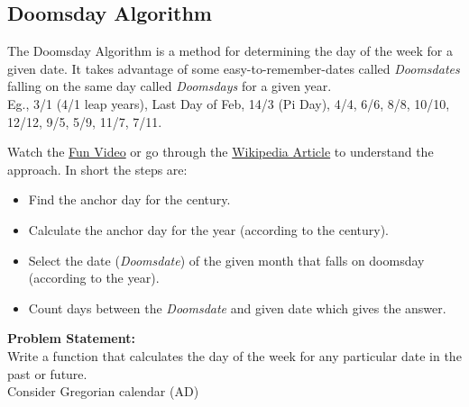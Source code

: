 \documentclass[../../Problems]{subfiles}
\begin{document}
\subsection{Doomsday Algorithm}
The Doomsday Algorithm is a method for determining the day of the week for a given date. It  takes advantage of some easy-to-remember-dates called \emph{Doomsdates} falling on the same day called \emph{Doomsdays} for a given year.\\
Eg., 3/1 (4/1 leap years), Last Day of Feb, 14/3 (Pi Day), 4/4, 6/6, 8/8, 10/10, 12/12, 9/5, 5/9, 11/7, 7/11.

Watch the \href{https://youtu.be/z2x3SSBVGJU}{Fun Video} or go through the \href{https://en.wikipedia.org/wiki/Doomsday_rule}{Wikipedia Article} to understand the approach. In short the steps are:
\begin{itemize}
\item Find the anchor day for the century.
\item Calculate the anchor day for the year (according to the century).
\item Select the date (\emph{Doomsdate}) of the given month that falls on doomsday (according to the year).
\item Count days between the \emph{Doomsdate} and given date which gives the answer.
\end{itemize}
\textbf{Problem Statement:}\\
Write a function that calculates the day of the week for any particular date in the past or future.\\
Consider Gregorian calendar (AD)
\end{document}
